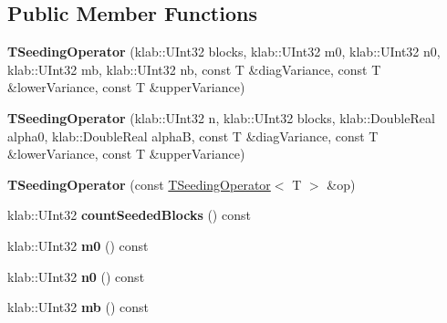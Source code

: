 \subsection*{Public Member Functions}
\begin{DoxyCompactItemize}
\item 
{\bfseries T\+Seeding\+Operator} (klab\+::\+U\+Int32 blocks, klab\+::\+U\+Int32 m0, klab\+::\+U\+Int32 n0, klab\+::\+U\+Int32 mb, klab\+::\+U\+Int32 nb, const T \&diag\+Variance, const T \&lower\+Variance, const T \&upper\+Variance)\hypertarget{classkl1p_1_1TSeedingOperator_a2e7933795fbec1956badc54b1ae56c41}{}\label{classkl1p_1_1TSeedingOperator_a2e7933795fbec1956badc54b1ae56c41}

\item 
{\bfseries T\+Seeding\+Operator} (klab\+::\+U\+Int32 n, klab\+::\+U\+Int32 blocks, klab\+::\+Double\+Real alpha0, klab\+::\+Double\+Real alphaB, const T \&diag\+Variance, const T \&lower\+Variance, const T \&upper\+Variance)\hypertarget{classkl1p_1_1TSeedingOperator_a9011d55ca8a0ca98f2bee46f0f63407f}{}\label{classkl1p_1_1TSeedingOperator_a9011d55ca8a0ca98f2bee46f0f63407f}

\item 
{\bfseries T\+Seeding\+Operator} (const \hyperlink{classkl1p_1_1TSeedingOperator}{T\+Seeding\+Operator}$<$ T $>$ \&op)\hypertarget{classkl1p_1_1TSeedingOperator_a25ec3f271d2c968c190e20e28ca22ce8}{}\label{classkl1p_1_1TSeedingOperator_a25ec3f271d2c968c190e20e28ca22ce8}

\item 
klab\+::\+U\+Int32 {\bfseries count\+Seeded\+Blocks} () const \hypertarget{classkl1p_1_1TSeedingOperator_a5d96e3065df4bc25a97643eeb3f4ca9a}{}\label{classkl1p_1_1TSeedingOperator_a5d96e3065df4bc25a97643eeb3f4ca9a}

\item 
klab\+::\+U\+Int32 {\bfseries m0} () const \hypertarget{classkl1p_1_1TSeedingOperator_ab826e21e5dce8902738dc6789f89713c}{}\label{classkl1p_1_1TSeedingOperator_ab826e21e5dce8902738dc6789f89713c}

\item 
klab\+::\+U\+Int32 {\bfseries n0} () const \hypertarget{classkl1p_1_1TSeedingOperator_a4f928f6050b11e145d75428d8473118f}{}\label{classkl1p_1_1TSeedingOperator_a4f928f6050b11e145d75428d8473118f}

\item 
klab\+::\+U\+Int32 {\bfseries mb} () const \hypertarget{classkl1p_1_1TSeedingOperator_a00bc777fcb5a068f4014c8264aeba9dd}{}\label{classkl1p_1_1TSeedingOperator_a00bc777fcb5a068f4014c8264aeba9dd}


\end{DoxyCompactItemize}
